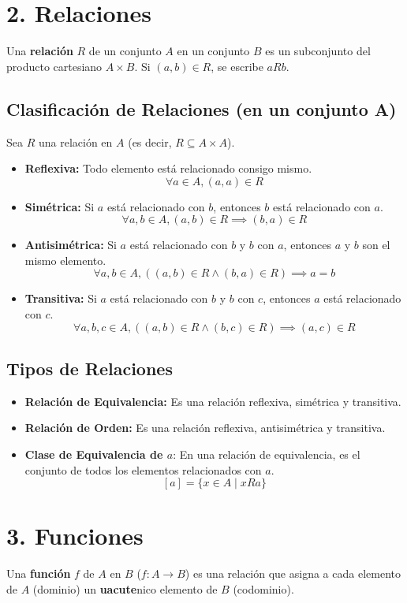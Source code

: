 \documentclass{article}
\begin{document}
\section*{2. Relaciones}
Una \textbf{relaci\'{o}n} $R$ de un conjunto $A$ en un conjunto $B$ es un subconjunto del producto cartesiano $A \times B$. Si $(a, b) \in R$, se escribe $aRb$.

\subsection*{Clasificaci\'{o}n de Relaciones (en un conjunto A)}
Sea $R$ una relaci\'{o}n en $A$ (es decir, $R \subseteq A \times A$).
\begin{itemize}
    \item \textbf{Reflexiva:} Todo elemento est\'{a} relacionado consigo mismo.
    \[ \forall a \in A, (a, a) \in R \]
    \item \textbf{Sim\'{e}trica:} Si $a$ est\'{a} relacionado con $b$, entonces $b$ est\'{a} relacionado con $a$.
    \[ \forall a, b \in A, (a, b) \in R \implies (b, a) \in R \]
    \item \textbf{Antisim\'{e}trica:} Si $a$ est\'{a} relacionado con $b$ y $b$ con $a$, entonces $a$ y $b$ son el mismo elemento.
    \[ \forall a, b \in A, ((a, b) \in R \land (b, a) \in R) \implies a = b \]
    \item \textbf{Transitiva:} Si $a$ est\'{a} relacionado con $b$ y $b$ con $c$, entonces $a$ est\'{a} relacionado con $c$.
    \[ \forall a, b, c \in A, ((a, b) \in R \land (b, c) \in R) \implies (a, c) \in R \]
\end{itemize}

\subsection*{Tipos de Relaciones}
\begin{itemize}
    \item \textbf{Relaci\'{o}n de Equivalencia:} Es una relaci\'{o}n reflexiva, sim\'{e}trica y transitiva.
    \item \textbf{Relaci\'{o}n de Orden:} Es una relaci\'{o}n reflexiva, antisim\'{e}trica y transitiva.
    \item \textbf{Clase de Equivalencia de $a$}: En una relaci\'{o}n de equivalencia, es el conjunto de todos los elementos relacionados con $a$.
    \[ [a] = \{x \in A \mid xRa\} \]
\end{itemize}

\section*{3. Funciones}
Una \textbf{funci\'{o}n} $f$ de $A$ en $B$ ($f: A \to B$) es una relaci\'{o}n que asigna a cada elemento de $A$ (dominio) un \textbf{uacute}nico elemento de $B$ (codominio).
\end{document}
